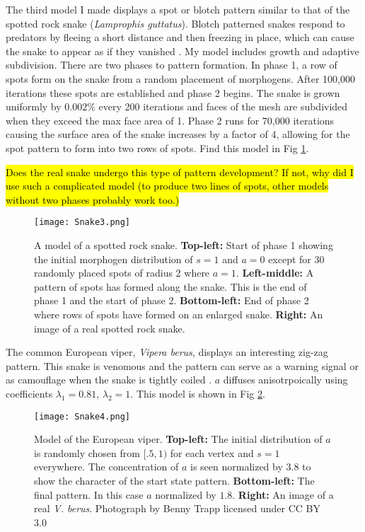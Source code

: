 The third model I made displays a spot or blotch pattern similar to that of the spotted rock snake (\textit{Lamprophis guttatus}). Blotch patterned snakes respond to predators by fleeing a short distance and then freezing in place, which can cause the snake to appear as if they vanished \citep{lillywhite2014}. 
My model includes growth and adaptive subdivision. There are two phases to pattern formation. In phase 1, a row of spots form on the snake from a random placement of morphogens. After 100,000 iterations these spots are established and phase 2 begins. The snake is grown uniformly by $0.002\%$ every 200 iterations and faces of the mesh are subdivided when they exceed the max face area of 1. Phase 2 runs for 70,000 iterations causing the surface area of the snake increases by a factor of 4, allowing for the spot pattern to form into two rows of spots. Find this model in Fig \ref{fig:Snake3}.

\hl{Does the real snake undergo this type of pattern development? If not, why did I use such a complicated model (to produce two lines of spots, other models without two phases probably work too.)}

\begin{figure}[ht]
	\centering
	\texttt{[image: Snake3.png]}
	\caption{A model of a spotted rock snake. \textbf{Top-left:} Start of phase 1 showing the initial morphogen distribution of $s=1$ and $a=0$ except for 30 randomly placed spots of radius 2 where $a=1$. \textbf{Left-middle:} A pattern of spots has formed along the snake. This is the end of phase 1 and the start of phase 2. \textbf{Bottom-left:} End of phase 2 where rows of spots have formed on an enlarged snake. \textbf{Right:} An image of a real spotted rock snake.}
	\label{fig:Snake3}
\end{figure}

The common European viper, \textit{Vipera berus}, displays an interesting zig-zag pattern. This snake is venomous and the pattern can serve as a warning signal or as camouflage when the snake is tightly coiled \citep{lillywhite2014}. $a$ diffuses anisotrpoically using coefficients $\lambda_{1}=0.81$, $\lambda_{2}=1$. This model is shown in Fig \ref{fig:Snake4}.

\newpage 

\begin{figure}[ht]
	\centering
	\texttt{[image: Snake4.png]}
	\caption{Model of the European viper. \textbf{Top-left:} The initial distribution of $a$ is randomly chosen from $[.5, 1)$ for each vertex and $s=1$ everywhere. The concentration of $a$ is seen normalized by 3.8 to show the character of the start state pattern. \textbf{Bottom-left:} The final pattern. In this case $a$ normalized by $1.8$. \textbf{Right:} An image of a real \textit{V. berus}. \textcolor{citation-gray}{Photograph by Benny Trapp licensed under CC BY 3.0}}
	\label{fig:Snake4}
\end{figure}

